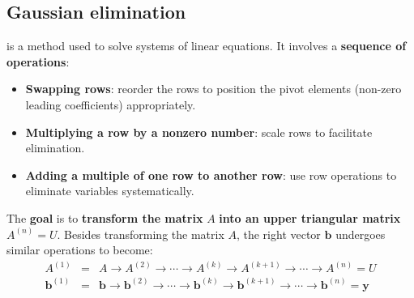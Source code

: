\subsection{Gaussian elimination}

 is a method used to solve systems of linear equations. It involves a \textbf{sequence of operations}:
\begin{itemize}
    \item \textbf{Swapping rows}: reorder the rows to position the pivot elements (non-zero leading coefficients) appropriately.
    \item \textbf{Multiplying a row by a nonzero number}: scale rows to facilitate elimination.
    \item \textbf{Adding a multiple of one row to another row}: use row operations to eliminate variables systematically.
\end{itemize}
The \textbf{goal} is to \textbf{transform the matrix} $A$ \textbf{into an upper triangular matrix} $A^{\left(n\right)} = U$. Besides transforming the matrix $A$, the right vector $\mathbf{b}$ undergoes similar operations to become:
\begin{equation*}
    \begin{array}{rcl}
        A^{\left(1\right)}          &=& A           \rightarrow A^{\left(2\right)}          \rightarrow \cdots \rightarrow A^{\left(k\right)}           \rightarrow A^{\left(k+1\right)}            \rightarrow \cdots \rightarrow A^{\left(n\right)} = U \\ [.8em]
        \mathbf{b}^{\left(1\right)} &=& \mathbf{b}  \rightarrow \mathbf{b}^{\left(2\right)} \rightarrow \cdots \rightarrow \mathbf{b}^{\left(k\right)}  \rightarrow \mathbf{b}^{\left(k+1\right)}   \rightarrow \cdots \rightarrow \mathbf{b}^{\left(n\right)} = \mathbf{y}
    \end{array}
\end{equation*}

